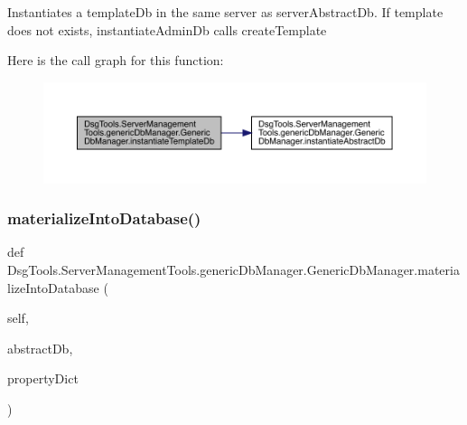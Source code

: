 \begin{DoxyVerb}Instantiates a templateDb in the same server as serverAbstractDb. 
If template does not exists, instantiateAdminDb calls createTemplate
\end{DoxyVerb}
 Here is the call graph for this function\+:
\nopagebreak
\begin{figure}[H]
\begin{center}
\leavevmode
\includegraphics[width=350pt]{class_dsg_tools_1_1_server_management_tools_1_1generic_db_manager_1_1_generic_db_manager_afdb4c9149490e8c8b751f0d15eb8a54d_cgraph}
\end{center}
\end{figure}
\mbox{\label{class_dsg_tools_1_1_server_management_tools_1_1generic_db_manager_1_1_generic_db_manager_a38ba344295e7df9c16d05ace9f2ec8f3}} 
\subsubsection{\texorpdfstring{materialize\+Into\+Database()}{materializeIntoDatabase()}}
{\footnotesize\ttfamily def Dsg\+Tools.\+Server\+Management\+Tools.\+generic\+Db\+Manager.\+Generic\+Db\+Manager.\+materialize\+Into\+Database (\begin{DoxyParamCaption}\item[{}]{self,  }\item[{}]{abstract\+Db,  }\item[{}]{property\+Dict }\end{DoxyParamCaption})}

